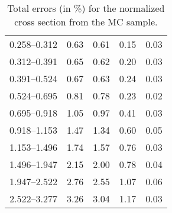 \begin{table}
\begin{center}
\begin{tabular}{@{}l l l l l@{}}
            0.258--0.312 & 0.63 & 0.61 & 0.15 & 0.03  \\
            0.312--0.391 & 0.65 & 0.62 & 0.20 & 0.03  \\
            0.391--0.524 & 0.67 & 0.63 & 0.24 & 0.03  \\
            0.524--0.695 & 0.81 & 0.78 & 0.23 & 0.02  \\
            0.695--0.918 & 1.05 & 0.97 & 0.41 & 0.03  \\
            0.918--1.153 & 1.47 & 1.34 & 0.60 & 0.05  \\
            1.153--1.496 & 1.74 & 1.57 & 0.76 & 0.03  \\
            1.496--1.947 & 2.15 & 2.00 & 0.78 & 0.04  \\
            1.947--2.522 & 2.76 & 2.55 & 1.07 & 0.06  \\
            2.522--3.277 & 3.26 & 3.04 & 1.17 & 0.03  \\
            \bottomrule
        \end{tabular}
    \end{center}
    \caption{
        Total errors (in \%) for the normalized cross section from the
        \POWHEG MC sample.
    }
    \label{tab:powheg_uncert_norm}
\end{table}
